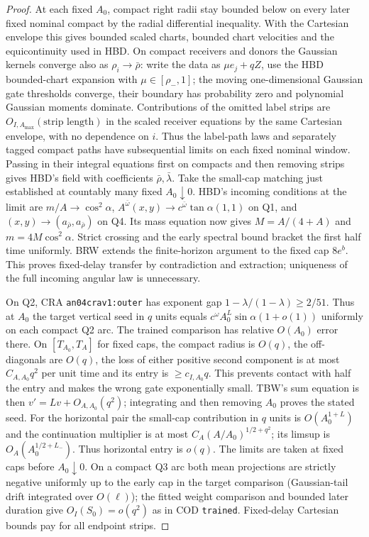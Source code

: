 \documentclass[11pt]{article}
\begin{document}
\begin{proof}
At each fixed $A_0$, compact right radii stay bounded below on every later fixed nominal compact by the radial differential inequality. With the Cartesian envelope this gives bounded scaled charts, bounded chart velocities and the equicontinuity used in HBD. On compact receivers and donors the Gaussian kernels converge also as $\rho_i\to\bar\rho$: write the data as $\mu e_j+q Z$, use the HBD bounded-chart expansion with $\mu\in[\rho_-,1]$; the moving one-dimensional Gaussian gate thresholds converge, their boundary has probability zero and polynomial Gaussian moments dominate. Contributions of the omitted label strips are $O_{I,A_{\max}}(\text{strip length})$ in the scaled receiver equations by the same Cartesian envelope, with no dependence on $i$. Thus the label-path laws and separately tagged compact paths have subsequential limits on each fixed nominal window. Passing in their integral equations first on compacts and then removing strips gives HBD's field with coefficients $\bar\rho,\bar\lambda$. Take the small-cap matching just established at countably many fixed $A_0\downarrow0$. HBD's incoming conditions at the limit are $m/A\to\cos^2\alpha$, $A^{\bar\omega}(x,y)\to c^{\bar\omega}\tan\alpha(1,1)$ on Q1, and $(x,y)\to(a_{\bar\rho},a_{\bar\rho})$ on Q4. Its mass equation now gives $M=A/(4+A)$ and $m=4M\cos^2\alpha$. Strict crossing and the early spectral bound bracket the first half time uniformly. BRW extends the finite-horizon argument to the fixed cap $8e^b$. This proves fixed-delay transfer by contradiction and extraction; uniqueness of the full incoming angular law is unnecessary.

On Q2, CRA \texttt{an04crav1:outer} has exponent gap $1-\lambda/(1-\lambda)\ge2/51$. Thus at $A_0$ the target vertical seed in $q$ units equals $c^\omega A_0^L\sin\alpha(1+o(1))$ uniformly on each compact Q2 arc. The trained comparison has relative $O(A_0)$ error there. On $[T_{A_0},T_A]$ for fixed caps, the compact radius is $O(q)$, the off-diagonals are $O(q)$, the loss of either positive second component is at most $C_{A,A_0}q^2$ per unit time and its entry is $\ge c_{I,A_0}q$. This prevents contact with half the entry and makes the wrong gate exponentially small. TBW's sum equation is then $v'=Lv+O_{A,A_0}(q^2)$; integrating and then removing $A_0$ proves the stated seed. For the horizontal pair the small-cap contribution in $q$ units is $O(A_0^{1+L})$ and the continuation multiplier is at most $C_A(A/A_0)^{1/2+q^2}$; its limsup is $O_A(A_0^{1/2+L_-})$. Thus horizontal entry is $o(q)$. The limits are taken at fixed caps before $A_0\downarrow0$. On a compact Q3 arc both mean projections are strictly negative uniformly up to the early cap in the target comparison (Gaussian-tail drift integrated over $O(\ell)$); the fitted weight comparison and bounded later duration give $O_I(S_0)=o(q^2)$ as in COD \texttt{trained}. Fixed-delay Cartesian bounds pay for all endpoint strips.


\end{proof}
\end{document}
